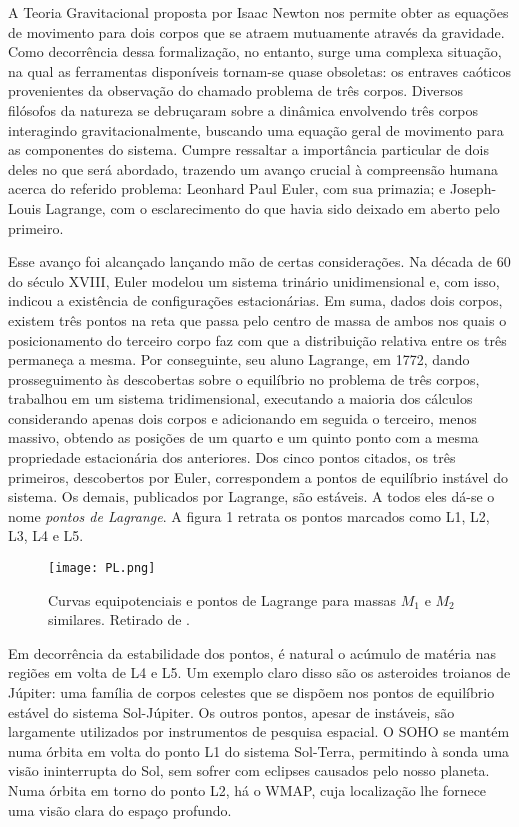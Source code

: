 A Teoria Gravitacional proposta por Isaac Newton nos permite obter as equações de movimento para dois corpos que se atraem mutuamente através da gravidade. Como decorrência dessa formalização, no entanto, surge uma complexa situação, na qual as ferramentas disponíveis tornam-se quase obsoletas: os entraves caóticos provenientes da observação do chamado problema de três corpos. Diversos filósofos da natureza se debruçaram sobre a dinâmica envolvendo três corpos interagindo gravitacionalmente, buscando uma equação geral de movimento para as componentes do sistema. Cumpre ressaltar a importância particular de dois deles no que será abordado, trazendo um avanço crucial à compreensão humana acerca do referido problema: Leonhard Paul Euler, com sua primazia; e Joseph-Louis Lagrange, com o esclarecimento do que havia sido deixado em aberto pelo primeiro.

Esse avanço foi alcançado lançando mão de certas considerações. Na década de 60 do século XVIII, Euler modelou um sistema trinário unidimensional\cite{eultc} e, com isso, indicou a existência de configurações estacionárias. Em suma, dados dois corpos, existem três pontos na reta que passa pelo centro de massa de ambos nos quais o posicionamento do terceiro corpo faz com que a distribuição relativa entre os três permaneça a mesma. Por conseguinte, seu aluno Lagrange, em 1772, dando prosseguimento às descobertas sobre o equilíbrio no problema de três corpos, trabalhou em um sistema tridimensional, executando a maioria dos cálculos considerando apenas dois corpos e adicionando em seguida o terceiro, menos massivo\cite{lagtc}, obtendo as posições de um quarto e um quinto ponto com a mesma propriedade estacionária dos anteriores. Dos cinco pontos citados, os três primeiros, descobertos por Euler, correspondem a pontos de equilíbrio instável do sistema. Os demais, publicados por Lagrange, são estáveis. A todos eles dá-se o nome \textit{pontos de Lagrange}. A figura 1 retrata os pontos marcados como L1, L2, L3, L4 e L5.

\begin{figure}[!h]
\centering
\texttt{[image: PL.png]}
\caption{Curvas equipotenciais e pontos de Lagrange para massas $M_1$ e $M_2$ similares. Retirado de \cite[figura 23.68, p. 526]{ksouza}.}
\end{figure}
   
Em decorrência da estabilidade dos pontos, é natural o acúmulo de matéria nas regiões em volta de L4 e L5. Um exemplo claro disso são os asteroides troianos de Júpiter: uma família de corpos celestes que se dispõem nos pontos de equilíbrio estável do sistema Sol-Júpiter. Os outros pontos, apesar de instáveis, são largamente utilizados por instrumentos de pesquisa espacial. O SOHO\cite{soho} se mantém numa órbita em volta do ponto L1 do sistema Sol-Terra, permitindo à sonda uma visão ininterrupta do Sol, sem sofrer com eclipses causados pelo nosso planeta. Numa órbita em torno do ponto L2, há o WMAP\cite{wmap}, cuja localização lhe fornece uma visão clara do espaço profundo.



